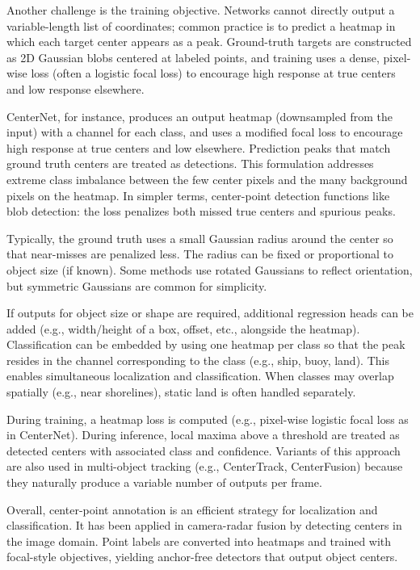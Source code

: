 \documentclass[twocolumn, 10pt]{article}
\begin{document}
Another challenge is the training objective. Networks cannot directly output a variable-length list of coordinates; common practice is to predict a heatmap in which each target center appears as a peak. Ground-truth targets are constructed as 2D Gaussian blobs centered at labeled points, and training uses a dense, pixel-wise loss (often a logistic focal loss) to encourage high response at true centers and low response elsewhere\cite{ref13}.


CenterNet, for instance, produces an output heatmap (downsampled from the input) with a channel for each class, and uses a modified focal loss to encourage high response at true centers and low elsewhere\cite{ref13}. Prediction peaks that match ground truth centers are treated as detections. This formulation addresses extreme class imbalance between the few center pixels and the many background pixels on the heatmap\cite{ref13}. In simpler terms, center-point detection functions like blob detection: the loss penalizes both missed true centers and spurious peaks.

Typically, the ground truth uses a small Gaussian radius around the center so that near-misses are penalized less. The radius can be fixed or proportional to object size (if known). Some methods use rotated Gaussians to reflect orientation\cite{ref16}, but symmetric Gaussians are common for simplicity.

If outputs for object size or shape are required, additional regression heads can be added (e.g., width/height of a box, offset, etc., alongside the heatmap)\cite{ref13}. Classification can be embedded by using one heatmap per class so that the peak resides in the channel corresponding to the class\cite{ref13} (e.g., ship, buoy, land). This enables simultaneous localization and classification. When classes may overlap spatially (e.g., near shorelines), static land is often handled separately.

During training, a heatmap loss is computed (e.g., pixel-wise logistic focal loss as in CenterNet\cite{ref13}). During inference, local maxima above a threshold are treated as detected centers with associated class and confidence. Variants of this approach are also used in multi-object tracking (e.g., CenterTrack, CenterFusion) because they naturally produce a variable number of outputs per frame\cite{ref13}.

Overall, center-point annotation is an efficient strategy for localization and classification. It has been applied in camera-radar fusion by detecting centers in the image domain\cite{ref13}. Point labels are converted into heatmaps and trained with focal-style objectives, yielding anchor-free detectors that output object centers.
\end{document}
